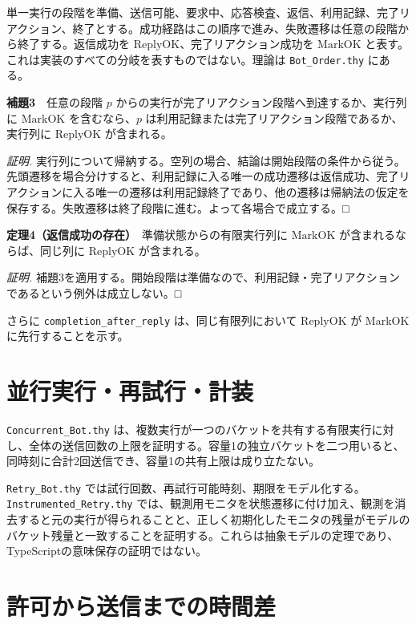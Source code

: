\documentclass[
  japanese,
]{ltjsarticle}
\begin{document}
単一実行の段階を準備、送信可能、要求中、応答検査、返信、利用記録、完了リアクション、終了とする。成功経路はこの順序で進み、失敗遷移は任意の段階から終了する。返信成功を
\(\mathrm{ReplyOK}\)、完了リアクション成功を \(\mathrm{MarkOK}\)
と表す。これは実装のすべての分岐を表すものではない。理論は
\texttt{Bot\_Order.thy} にある。

\textbf{補題3}　任意の段階 \(p\)
からの実行が完了リアクション段階へ到達するか、実行列に
\(\mathrm{MarkOK}\) を含むなら、\(p\)
は利用記録または完了リアクション段階であるか、実行列に
\(\mathrm{ReplyOK}\) が含まれる。

\emph{証明.}
実行列について帰納する。空列の場合、結論は開始段階の条件から従う。先頭遷移を場合分けすると、利用記録に入る唯一の成功遷移は返信成功、完了リアクションに入る唯一の遷移は利用記録終了であり、他の遷移は帰納法の仮定を保存する。失敗遷移は終了段階に進む。よって各場合で成立する。□

\textbf{定理4（返信成功の存在）}　準備状態からの有限実行列に
\(\mathrm{MarkOK}\) が含まれるならば、同じ列に \(\mathrm{ReplyOK}\)
が含まれる。

\emph{証明.}
補題3を適用する。開始段階は準備なので、利用記録・完了リアクションであるという例外は成立しない。□

さらに \texttt{completion\_after\_reply} は、同じ有限列において
\(\mathrm{ReplyOK}\) が \(\mathrm{MarkOK}\) に先行することを示す。

\section{並行実行・再試行・計装}\label{ux4e26ux884cux5b9fux884cux518dux8a66ux884cux8a08ux88c5}

\texttt{Concurrent\_Bot.thy}
は、複数実行が一つのバケットを共有する有限実行に対し、全体の送信回数の上限を証明する。容量1の独立バケットを二つ用いると、同時刻に合計2回送信でき、容量1の共有上限は成り立たない。

\texttt{Retry\_Bot.thy}
では試行回数、再試行可能時刻、期限をモデル化する。\texttt{Instrumented\_Retry.thy}
では、観測用モニタを状態遷移に付け加え、観測を消去すると元の実行が得られることと、正しく初期化したモニタの残量がモデルのバケット残量と一致することを証明する。これらは抽象モデルの定理であり、TypeScriptの意味保存の証明ではない。

\section{許可から送信までの時間差}\label{ux8a31ux53efux304bux3089ux9001ux4fe1ux307eux3067ux306eux6642ux9593ux5dee}
\end{document}
